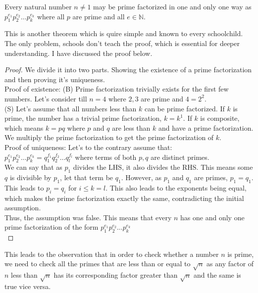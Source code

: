 \begin{theorem}
    Every natural number $n \neq 1$ may be prime factorized in one and only one way as $p_1^{e_1}p_2^{e_2}\dots p_k^{e_k}$ where all $p$ are prime and all $e \in \mathbb{N}$.
\end{theorem}
This is another theorem which is quire simple and known to every schoolchild. The only problem, schools don't teach the proof, which is essential for deeper understanding. I have discussed the proof below.\\
\begin{proof}
    We divide it into two parts. Showing the existence of a prime factorization and then proving it's uniqueness.\\
    Proof of existence: (B) Prime factorization trivially exists for the first few numbers. Let's consider till $n=4$ where $2,3$ are prime and $4=2^2$.\\
    (S) Let's assume that all numbers less than $k$ can be prime factorized. If $k$ is prime, the number has a trivial prime factorization, $k=k^1$. If $k$ is composite, which means $k=pq$ where $p$ and $q$ are less than $k$ and have a prime factorization. We multiply the prime factorization to get the prime factorization of $k$.\\
    Proof of uniqueness: Let's to the contrary assume that:\\
    $p_1^{e_1}p_2^{e_2}\dots p_k^{e_k}=q_1^{f_1}q_2^{f_2}\dots q_l^{f_l}$ where terms of both $p,q$ are distinct primes.\\
    We can say that as $p_1$ divides the LHS, it also divides the RHS. This means some $q$ is divisible by $p_1$, let that term be $q_1$. However, as $p_1$ and $q_1$ are primes, $p_1=q_1$. This leads to $p_i=q_i$ for $i \leq k=l$. This also leads to the exponents being equal, which makes the prime factorization exactly the same, contradicting the initial assumption.\\
    Thus, the assumption was false. This means that every $n$ has one and only one prime factorization of the form $p_1^{e_1}p_2^{e_2}\dots p_k^{e_k}$\\
\end{proof}
This leads to the observation that in order to check whether a number $n$ is prime, we need to check all the primes that are less than or equal to $\sqrt{n}$ as any factor of $n$ less than $\sqrt{n}$ has its corresponding factor greater than $\sqrt{n}$ and the same is true vice versa.\\
